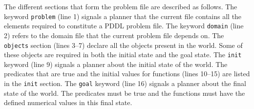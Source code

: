 The different sections that form the problem file are described as follows. The keyword \texttt{problem} (line 1) signals a planner that the current file contains all the elements required to constitute a PDDL problem file. The keyword \texttt{domain} (line 2) refers to the domain file that the current problem file depends on. The \texttt{objects} section (lines 3--7) declare all the objects present in the world. Some of these objects are required in both the initial state and the goal state. The \texttt{init} keyword (line 9) signals a planner about the initial state of the world. The predicates that are true and the initial values for functions (lines 10--15) are listed in the \texttt{init} section. The \texttt{goal} keyword (line 16) signals a planner about the final state of the world. The predicates must be true and the functions must have the defined numerical values in this final state.

